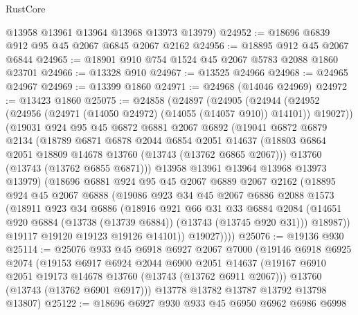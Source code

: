 \begin{lexlean}{RustCore}
\begin{coremodule}
      @13958
      @13961
      @13964
      @13968
      @13973
      @13979)
@24952 := @18696 @6839 @912 @95 @45 @2067 @6845 @2067 @2162
@24956 := @18895 @912 @45 @2067 @6844
@24965 := @18901 @910 @754 @1524 @45 @2067 @5783 @2088 @1860 @23701
@24966 := @13328 @910
@24967 := @13525 @24966
@24968 := @24965 @24967
@24969 := @13399 @1860
@24971 := @24968 (@14046 @24969)
@24972 := @13423 @1860
@25075 := @24858
    (@24897
      (@24905
        (@24944 (@24952 (@24956 (@24971 (@14050 @24972) (@14055 (@14057 @910)) @14101)) @19027))
        (@19031
          @924
          @95
          @45
          @6872
          @6881
          @2067
          @6892
          (@19041
            @6872
            @6879
            @2134
            (@18789
              @6871
              @6878
              @2044
              @6854
              @2051
              @14637
              (@18803 @6864 @2051 @18809 @14678 @13760 (@13743 (@13762 @6865 @2067)))
              @13760
              (@13743 (@13762 @6855 @6871)))
            @13958
            @13961
            @13964
            @13968
            @13973
            @13979)
          (@18696
            @6881
            @924
            @95
            @45
            @2067
            @6889
            @2067
            @2162
            (@18895
              @924
              @45
              @2067
              @6888
              (@19086
                @923
                @34
                @45
                @2067
                @6886
                @2088
                @1573
                (@18911
                  @923
                  @34
                  @6886
                  (@18916
                    @921
                    @66
                    @31
                    @33
                    @6884
                    @2084
                    (@14651 @920 @6884 (@13738 (@13739 @6884)) (@13743 (@13745 @920 @31)))
                    @18987))
                @19117
                @19120
                @19123
                @19126
                @14101))
            @19027))))
@25076 := @19136 @930
@25114 := @25076
    @933
    @45
    @6918
    @6927
    @2067
    @7000
    (@19146
      @6918
      @6925
      @2074
      (@19153
        @6917
        @6924
        @2044
        @6900
        @2051
        @14637
        (@19167 @6910 @2051 @19173 @14678 @13760 (@13743 (@13762 @6911 @2067)))
        @13760
        (@13743 (@13762 @6901 @6917)))
      @13778
      @13782
      @13787
      @13792
      @13798
      @13807)
@25122 := @18696 @6927 @930 @933 @45 @6950 @6962 @6986 @6998

\end{coremodule}
\end{lexlean}
